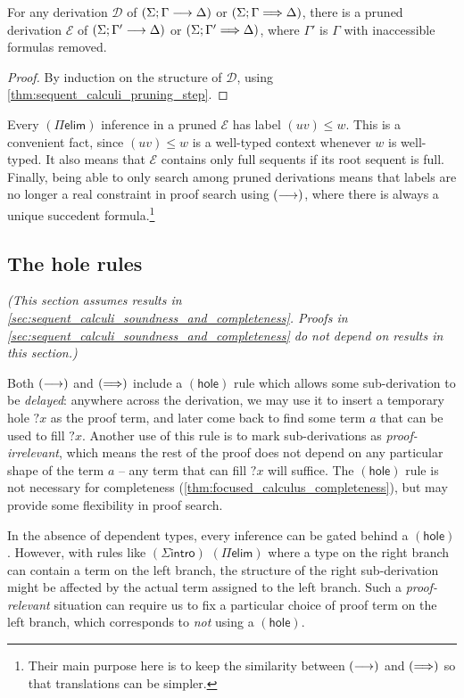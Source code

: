\documentclass[twoside]{report}
\begin{document}
\begin{proposition}
    \label{thm:sequent_calculi_pruning}
    For any derivation $\mathcal D$ of $(\Sigma; \Gamma \longrightarrow \Delta)$ or $(\Sigma; \Gamma \Longrightarrow \Delta)$, there is a pruned derivation $\mathcal E$ of $(\Sigma; \Gamma' \longrightarrow \Delta)$ or $(\Sigma; \Gamma' \Longrightarrow \Delta)$, where $\Gamma'$ is $\Gamma$ with inaccessible formulas removed.
\end{proposition}

\begin{proof}
    By induction on the structure of $\mathcal D$, using \cref{thm:sequent_calculi_pruning_step}.
\end{proof}

Every $(\Pi\mathsf{elim})$ inference in a pruned $\mathcal E$ has label $(uv) \leq w$. This is a convenient fact, since $(uv) \leq w$ is a well-typed context whenever $w$ is well-typed. It also means that $\mathcal E$ contains only full sequents if its root sequent is full. Finally, being able to only search among pruned derivations means that labels are no longer a real constraint in proof search using $(\longrightarrow)$, where there is always a unique succedent formula.\footnote{Their main purpose here is to keep the similarity between $(\longrightarrow)$ and $(\Longrightarrow)$ so that translations can be simpler.}

\subsection*{The hole rules}

\emph{(This section assumes results in \cref{sec:sequent_calculi_soundness_and_completeness}. Proofs in \cref{sec:sequent_calculi_soundness_and_completeness} do not depend on results in this section.)}

Both $(\longrightarrow)$ and $(\Longrightarrow)$ include a $(\mathsf{hole})$ rule which allows some sub-derivation to be \emph{delayed}: anywhere across the derivation, we may use it to insert a temporary hole ${?x}$ as the proof term, and later come back to find some term $a$ that can be used to fill ${?x}$. Another use of this rule is to mark sub-derivations as \emph{proof-irrelevant}, which means the rest of the proof does not depend on any particular shape of the term $a$ -- any term that can fill ${?x}$ will suffice. The $(\mathsf{hole})$ rule is not necessary for completeness (\cref{thm:focused_calculus_completeness}), but may provide some flexibility in proof search.

In the absence of dependent types, every inference can be gated behind a $(\mathsf{hole})$. However, with rules like $(\Sigma\mathsf{intro})$ $(\Pi\mathsf{elim})$ where a type on the right branch can contain a term on the left branch, the structure of the right sub-derivation might be affected by the actual term assigned to the left branch. Such a \emph{proof-relevant} situation can require us to fix a particular choice of proof term on the left branch, which corresponds to \emph{not} using a $(\mathsf{hole})$.
\end{document}
